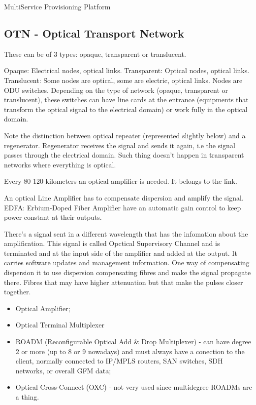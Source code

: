 MultiService Provisioning Platform







\subsection{OTN - Optical Transport Network}

These can be of 3 types: opaque, transparent or translucent.

Opaque: Electrical nodes, optical links.
Transparent: Optical nodes, optical links.
Translucent: Some nodes are optical, some are electric, optical links.
Nodes are ODU switches. Depending on the type of network (opaque, transparent or translucent), these switches can have line cards at the entrance (equipments that transform the optical signal to the electrical domain) or work fully in the optical domain.



Note the distinction between optical repeater (represented slightly below) and a regenerator. Regenerator receives the signal and sends it again, i.e the signal passes through the electrical domain. Such thing doesn't happen in transparent networks where everything is optical.


Every 80-120 kilometers an optical amplifier is needed. It belongs to the link.


An optical Line Amplifier has to compensate dispersion and amplify the signal.
EDFA: Erbium-Doped Fiber Amplifier have an automatic gain control to keep power constant at their outputs.


There's a signal sent in a different wavelength that has the infomation about the amplification. This signal is called Opctical Supervisory Channel and is terminated and at the input side of the amplifier and added at the output. It carries software updates and management information. One way of compensating dispersion it to use dispersion compensating fibres and make the signal propagate there. Fibres that may have higher attenuation but that make the pulses closer together.

\begin{itemize}
    \item Optical Amplifier;
    \item Optical Terminal Multiplexer
    \item ROADM (Reconfigurable Optical Add \& Drop Multiplexer) - can have degree 2 or more (up to 8 or 9 nowadays) and must always have a conection to the client, normally connected to IP/MPLS routers, SAN switches, SDH networks, or overall GFM data;
    \item Optical Cross-Connect (OXC) - not very used since multidegree ROADMs are a thing.
\end{itemize}

